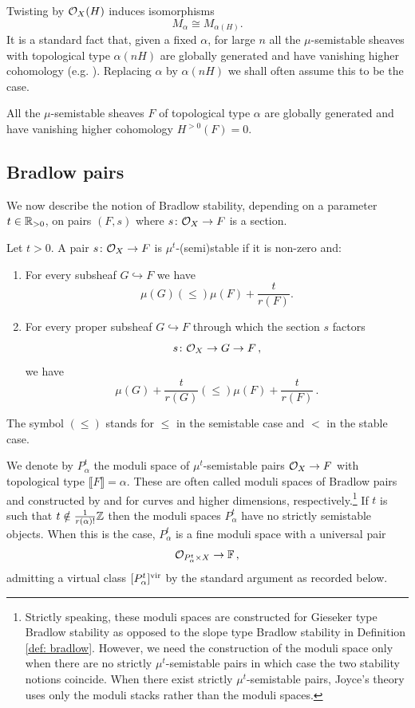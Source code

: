 \documentclass[a4paper, 12pt]{amsart}
\begin{document}
Twisting by ${\mathcal O}_X(H)$ induces isomorphisms
\[M_\alpha\cong M_{\alpha(H)}.\]
It is a standard fact that, given a fixed $\alpha$, for large $n$ all the $\mu$-semistable sheaves with topological type $\alpha(nH)$ are globally generated and have vanishing higher cohomology (e.g. \cite[Corollary 1.7.7]{HL}). Replacing $\alpha$ by $\alpha(nH)$ we shall often assume this to be the case.
\begin{assumption}\label{ass: alphabig}
All the $\mu$-semistable sheaves $F$ of topological type $\alpha$ are globally generated and have vanishing higher cohomology $H^{>0}(F)=0$. 
\end{assumption}



\subsection{Bradlow pairs}
\label{sec: Bradlowpairs}
We now describe the notion of Bradlow stability,  depending on a parameter $t\in {\mathbb{R}}_{>0}$, on pairs $(F, s)$ where $s\colon {\mathcal O}_X\to F$ is a section.

\begin{definition}\label{def: bradlow}
Let $t> 0$. A pair $s\colon {\mathcal O}_X\to F$ is $\mu^{t}$-(semi)stable if it is non-zero and:
\begin{enumerate}
    \item For every subsheaf $G\hookrightarrow F$ we have 
    \[\mu(G)(\leq)\mu(F)+\frac{t}{r(F)}.\]
    \item For every proper subsheaf $G\hookrightarrow F$ through which the section $s$ factors \[s\colon {\mathcal O}_X\to G\to F\,,\] we have 
    \[\mu(G)+\frac{t}{r(G)}(\leq) \mu(F)+\frac{t}{r(F)}\,.\]
\end{enumerate}
The symbol $(\leq)$ stands for $\leq$ in the semistable case and $<$ in the stable case.
\end{definition}
 We denote by $P_\alpha^t$ the moduli space of $\mu^t$-semistable pairs ${\mathcal O}_X\to F$ with topological type $\llbracket F\rrbracket=\alpha$. These are often called moduli spaces of Bradlow pairs and constructed by \cite[Section 1]{thaddeus} and \cite{LeP,lin} for curves and higher dimensions, respectively.\footnote{Strictly speaking, these moduli spaces are constructed for Gieseker type Bradlow stability as opposed to the slope type Bradlow stability in Definition \ref{def: bradlow}. However, we need the construction of the moduli space only when there are no strictly $\mu^t$-semistable pairs in which case the two stability notions coincide. When there exist strictly $\mu^t$-semistable pairs, Joyce's theory \cite{Jo21} uses only the moduli stacks rather than the moduli spaces.} If $t$ is such that $t\notin \frac{1}{r(\alpha)!}{\mathbb{Z}}$ then the moduli spaces $P_{\alpha}^t$ have no strictly semistable objects. When this is the case, $P_\alpha^t$ is a fine moduli space with a universal pair \[{\mathcal O}_{P_\alpha^t\times X}\to {\mathbb{F}}\,,\] admitting a virtual class $[P_\alpha^t]^{\mathrm{vir}}$ by the standard argument as recorded below.
\end{document}
